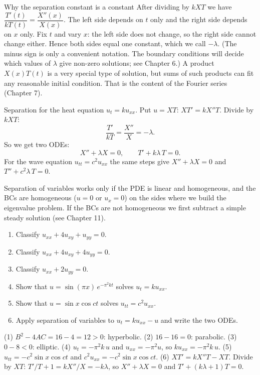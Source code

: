 \begin{derivbox}{Why the separation constant is a constant}
After dividing by $kXT$ we have $\dfrac{T'(t)}{kT(t)} = \dfrac{X''(x)}{X(x)}$. The left side depends on $t$ only and the right side depends on $x$ only. Fix $t$ and vary $x$: the left side does not change, so the right side cannot change either. Hence both sides equal one constant, which we call $-\lambda$. (The minus sign is only a convenient notation. The boundary conditions will decide which values of $\lambda$ give non-zero solutions; see Chapter 6.) A product $X(x)T(t)$ is a very special type of solution, but sums of such products can fit any reasonable initial condition. That is the content of the Fourier series (Chapter 7).
\end{derivbox}

\begin{examplebox}{Separation for the heat equation}
$u_t = ku_{xx}$. Put $u = XT$: $XT' = kX''T$. Divide by $kXT$:
\[ \frac{T'}{kT} = \frac{X''}{X} = -\lambda . \]
So we get two ODEs:
\[ X'' + \lambda X = 0, \qquad T' + k\lambda\,T = 0 . \]
For the wave equation $u_{tt} = c^2u_{xx}$ the same steps give $X'' + \lambda X = 0$ and $T'' + c^2\lambda\,T = 0$.
\end{examplebox}

\begin{notebox}
Separation of variables works only if the PDE is linear and homogeneous, and the BCs are homogeneous ($u=0$ or $u_x=0$) on the sides where we build the eigenvalue problem. If the BCs are not homogeneous we first subtract a simple steady solution (see Chapter 11).
\end{notebox}

\begin{practicebox}
\begin{enumerate}
  \item Classify $u_{xx} + 4u_{xy} + u_{yy} = 0$.
  \item Classify $u_{xx} + 4u_{xy} + 4u_{yy} = 0$.
  \item Classify $u_{xx} + 2u_{yy} = 0$.
  \item Show that $u = \sin(\pi x)\,e^{-\pi^2kt}$ solves $u_t = ku_{xx}$.
  \item Show that $u = \sin x\cos ct$ solves $u_{tt} = c^2u_{xx}$.
  \item Apply separation of variables to $u_t = ku_{xx} - u$ and write the two ODEs.
\end{enumerate}
\end{practicebox}

\begin{answerbox}
(1) $B^2 - 4AC = 16 - 4 = 12 > 0$: hyperbolic. \quad (2) $16 - 16 = 0$: parabolic. \quad (3) $0 - 8 < 0$: elliptic. \quad (4) $u_t = -\pi^2k\,u$ and $u_{xx} = -\pi^2u$, so $ku_{xx} = -\pi^2k\,u$. \checkmark \quad (5) $u_{tt} = -c^2\sin x\cos ct$ and $c^2u_{xx} = -c^2\sin x\cos ct$. \checkmark \quad (6) $XT' = kX''T - XT$. Divide by $XT$: $T'/T + 1 = kX''/X = -k\lambda$, so $X'' + \lambda X = 0$ and $T' + (k\lambda + 1)T = 0$.
\end{answerbox}
